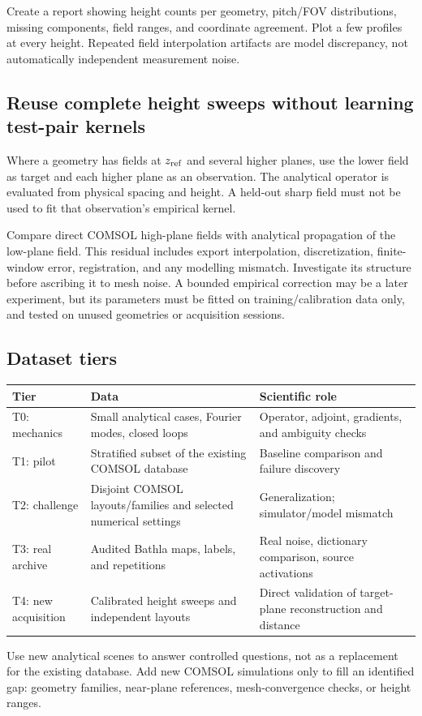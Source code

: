 Create a report showing height counts per geometry, pitch/FOV distributions, missing components, field ranges, and coordinate agreement. Plot a few profiles at every height. Repeated field interpolation artifacts are model discrepancy, not automatically independent measurement noise.

\subsection{Reuse complete height sweeps without learning test-pair kernels}
Where a geometry has fields at $z_{\rm ref}$ and several higher planes, use the lower field as target and each higher plane as an observation. The analytical operator is evaluated from physical spacing and height. A held-out sharp field must not be used to fit that observation's empirical kernel.

Compare direct COMSOL high-plane fields with analytical propagation of the low-plane field. This residual includes export interpolation, discretization, finite-window error, registration, and any modelling mismatch. Investigate its structure before ascribing it to mesh noise. A bounded empirical correction may be a later experiment, but its parameters must be fitted on training/calibration data only, and tested on unused geometries or acquisition sessions.

\subsection{Dataset tiers}
\begin{tabularx}{\linewidth}{P{27mm}YY}
\toprule Tier & Data & Scientific role\\\midrule
T0: mechanics & Small analytical cases, Fourier modes, closed loops & Operator, adjoint, gradients, and ambiguity checks\\
T1: pilot & Stratified subset of the existing COMSOL database & Baseline comparison and failure discovery\\
T2: challenge & Disjoint COMSOL layouts/families and selected numerical settings & Generalization; simulator/model mismatch\\
T3: real archive & Audited Bathla maps, labels, and repetitions & Real noise, dictionary comparison, source activations\\
T4: new acquisition & Calibrated height sweeps and independent layouts & Direct validation of target-plane reconstruction and distance\\\bottomrule
\end{tabularx}
Use new analytical scenes to answer controlled questions, not as a replacement for the existing database. Add new COMSOL simulations only to fill an identified gap: geometry families, near-plane references, mesh-convergence checks, or height ranges.

